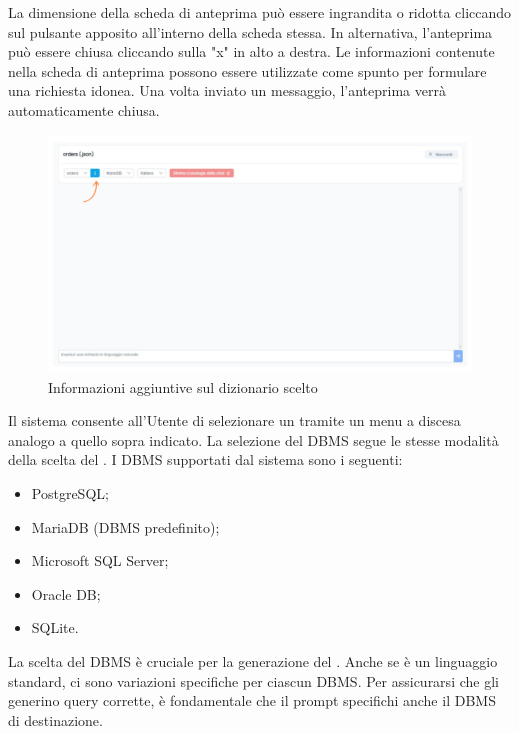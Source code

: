 \vspace{0.5\baselineskip}
\par La dimensione della scheda di anteprima può essere ingrandita o ridotta cliccando sul pulsante apposito all'interno della scheda stessa. In alternativa, l'anteprima può essere chiusa cliccando sulla "x" in alto a destra. Le informazioni contenute nella scheda di anteprima possono essere utilizzate come spunto per formulare una richiesta idonea. Una volta inviato un messaggio, l'anteprima verrà automaticamente chiusa.

\begin{figure}[H]
  \centering
  \includegraphics[width=1\textwidth]{assets/info_dizionario.png}
  \caption{Informazioni aggiuntive sul dizionario scelto}
\end{figure}


\par Il sistema consente all'Utente di selezionare un  tramite un menu a discesa analogo a quello sopra indicato. La selezione del DBMS segue le stesse modalità della scelta del . I DBMS supportati dal sistema sono i seguenti:
\begin{itemize}
  \item PostgreSQL;
  \item MariaDB (DBMS predefinito);
  \item Microsoft SQL Server;
  \item Oracle DB;
  \item SQLite.
\end{itemize}

\vspace{0.5\baselineskip}
\par La scelta del DBMS è cruciale per la generazione del . Anche se  è un linguaggio standard, ci sono variazioni specifiche per ciascun DBMS. Per assicurarsi che gli  generino query corrette, è fondamentale che il prompt specifichi anche il DBMS di destinazione.

